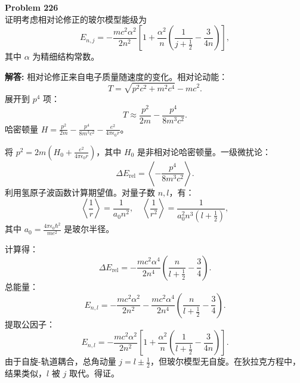 \documentclass[12pt, a4paper, oneside]{ctexart}
\newenvironment{solution}{\par\noindent\textbf{解答:}\quad}{\par}
\begin{document}
\begin{mdframed}[backgroundcolor=gray!10, linewidth=0pt]
    \textbf{Problem 226} \\
    证明考虑相对论修正的玻尔模型能级为
    \[
    E_{n,j} = -\frac{m c^2 \alpha^2}{2 n^2} \left[ 1 + \frac{\alpha^2}{n} \left( \frac{1}{j+\frac{1}{2}} - \frac{3}{4n} \right) \right],
    \]
    其中 $\alpha$ 为精细结构常数。
\end{mdframed}
\begin{solution}
    相对论修正来自电子质量随速度的变化。相对论动能：
    \[
    T = \sqrt{p^2 c^2 + m^2 c^4} - m c^2.
    \]
    展开到 $p^4$ 项：
    \[
    T \approx \frac{p^2}{2m} - \frac{p^4}{8 m^3 c^2}.
    \]
    哈密顿量 $H = \frac{p^2}{2m} - \frac{p^4}{8 m^3 c^2} - \frac{e^2}{4\pi\epsilon_0 r}$。
    
    将 $p^2 = 2m (H_0 + \frac{e^2}{4\pi\epsilon_0 r})$，其中 $H_0$ 是非相对论哈密顿量。一级微扰论：
    \[
    \Delta E_{\text{rel}} = \left\langle -\frac{p^4}{8 m^3 c^2} \right\rangle.
    \]
    利用氢原子波函数计算期望值。对量子数 $n,l$，有：
    \[
    \left\langle \frac{1}{r} \right\rangle = \frac{1}{a_0 n^2}, \quad \left\langle \frac{1}{r^2} \right\rangle = \frac{1}{a_0^2 n^3 (l+\frac{1}{2})},
    \]
    其中 $a_0 = \frac{4\pi\epsilon_0 \hbar^2}{m e^2}$ 是玻尔半径。
    
    计算得：
    \[
    \Delta E_{\text{rel}} = -\frac{m c^2 \alpha^4}{2 n^4} \left( \frac{n}{l+\frac{1}{2}} - \frac{3}{4} \right).
    \]
    总能量：
    \[
    E_{n,l} = -\frac{m c^2 \alpha^2}{2 n^2} - \frac{m c^2 \alpha^4}{2 n^4} \left( \frac{n}{l+\frac{1}{2}} - \frac{3}{4} \right).
    \]
    提取公因子：
    \[
    E_{n,l} = -\frac{m c^2 \alpha^2}{2 n^2} \left[ 1 + \frac{\alpha^2}{n} \left( \frac{1}{l+\frac{1}{2}} - \frac{3}{4n} \right) \right].
    \]
    由于自旋-轨道耦合，总角动量 $j = l \pm \frac{1}{2}$，但玻尔模型无自旋。在狄拉克方程中，结果类似，$l$ 被 $j$ 取代。得证。
\end{solution}
\end{document}
